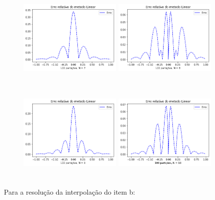 \documentclass{article}
\begin{document}
\begin{figure}[!htb]
\includegraphics [width=5cm,height=5cm]{ELa7.png}
\includegraphics [width=5cm,height=5cm]{ELa8.png}
\includegraphics [width=5cm,height=5cm]{ELa9.png}
\includegraphics [width=5cm,height=5cm]{ELa10.png}
\end{figure}

\newpage
\text Para a resolução da interpolação do item b:
\end{document}
